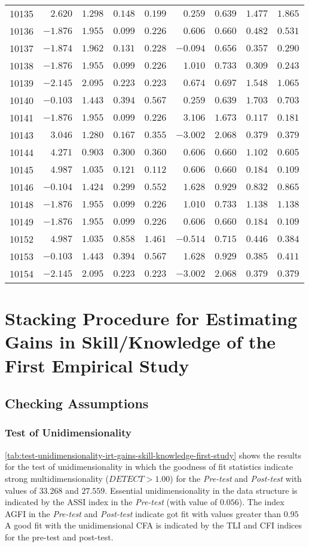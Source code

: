 {\begin{longtable}{l|rrrr|rrrr}
10135&$ 2.620$&$1.298$&$0.148$&$0.199$&$ 0.259$&$0.639$&$1.477$&$1.865$\tabularnewline
10136&$-1.876$&$1.955$&$0.099$&$0.226$&$ 0.606$&$0.660$&$0.482$&$0.531$\tabularnewline
10137&$-1.874$&$1.962$&$0.131$&$0.228$&$-0.094$&$0.656$&$0.357$&$0.290$\tabularnewline
10138&$-1.876$&$1.955$&$0.099$&$0.226$&$ 1.010$&$0.733$&$0.309$&$0.243$\tabularnewline
10139&$-2.145$&$2.095$&$0.223$&$0.223$&$ 0.674$&$0.697$&$1.548$&$1.065$\tabularnewline
10140&$-0.103$&$1.443$&$0.394$&$0.567$&$ 0.259$&$0.639$&$1.703$&$0.703$\tabularnewline
10141&$-1.876$&$1.955$&$0.099$&$0.226$&$ 3.106$&$1.673$&$0.117$&$0.181$\tabularnewline
10143&$ 3.046$&$1.280$&$0.167$&$0.355$&$-3.002$&$2.068$&$0.379$&$0.379$\tabularnewline
10144&$ 4.271$&$0.903$&$0.300$&$0.360$&$ 0.606$&$0.660$&$1.102$&$0.605$\tabularnewline
10145&$ 4.987$&$1.035$&$0.121$&$0.112$&$ 0.606$&$0.660$&$0.184$&$0.109$\tabularnewline
10146&$-0.104$&$1.424$&$0.299$&$0.552$&$ 1.628$&$0.929$&$0.832$&$0.865$\tabularnewline
10148&$-1.876$&$1.955$&$0.099$&$0.226$&$ 1.010$&$0.733$&$1.138$&$1.138$\tabularnewline
10149&$-1.876$&$1.955$&$0.099$&$0.226$&$ 0.606$&$0.660$&$0.184$&$0.109$\tabularnewline
10152&$ 4.987$&$1.035$&$0.858$&$1.461$&$-0.514$&$0.715$&$0.446$&$0.384$\tabularnewline
10153&$-0.103$&$1.443$&$0.394$&$0.567$&$ 1.628$&$0.929$&$0.385$&$0.411$\tabularnewline
10154&$-2.145$&$2.095$&$0.223$&$0.223$&$-3.002$&$2.068$&$0.379$&$0.379$\tabularnewline
\hline
\end{longtable}}


\section{Stacking Procedure for Estimating Gains in Skill/Knowledge of the First Empirical Study}
\label{sec:irt-learning-outcomes-first-study}


\subsection{Checking Assumptions}

\subsubsection*{Test of Unidimensionality}

\autoref{tab:test-unidimensionality-irt-gains-skill-knowledge-first-study} shows the results for the test of unidimensionality in which the goodness of fit statistics indicate strong multidimensionality ($DETECT > 1.00$) for the \emph{Pre-test} and \emph{Post-test} with values of $33.268$ and $27.559$. 
Essential unidimensionality in the data structure is indicated by the ASSI index in the \emph{Pre-test} (with value of $0.056$).
The index AGFI in the \emph{Pre-test} and \emph{Post-test} indicate got fit with values greater than $0.95$
A good fit with the unidimensional CFA is indicated by the TLI and CFI indices for the pre-test and post-test.

